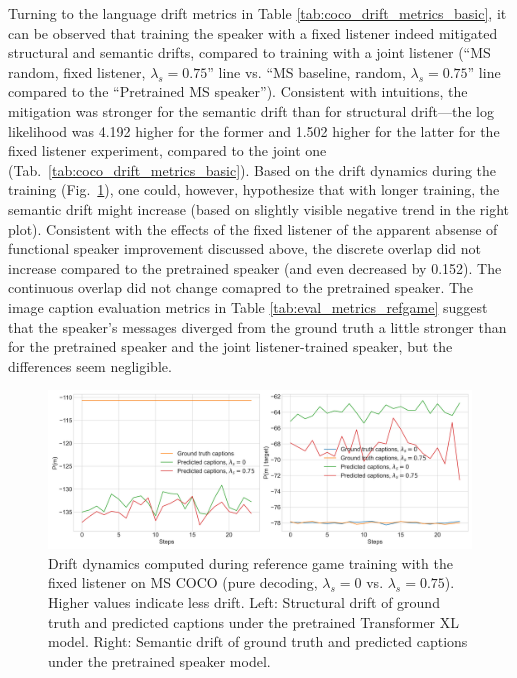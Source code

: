 Turning to the language drift metrics in Table \ref{tab:coco_drift_metrics_basic}, it can be observed that training the speaker with a fixed listener indeed mitigated structural and semantic drifts, compared to training with a joint listener (``MS random, fixed listener, $\lambda_s=0.75$'' line vs. ``MS baseline, random, $\lambda_s=0.75$'' line compared to the ``Pretrained MS speaker''). Consistent with intuitions, the mitigation was stronger for the semantic drift than for structural drift---the log likelihood was 4.192 higher for the former and 1.502 higher for the latter for the fixed listener experiment, compared to the joint one (Tab.~\ref{tab:coco_drift_metrics_basic}). Based on the drift dynamics during the training (Fig.~\ref{fig:coco_fixed_listener_075_str_sem_drift}), one could, however, hypothesize that with longer training, the semantic drift might increase (based on slightly visible negative trend in the right plot). Consistent with the effects of the fixed listener of the apparent absense of functional speaker improvement discussed above, the discrete overlap did not increase compared to the pretrained speaker (and even decreased by 0.152). The continuous overlap did not change comapred to the pretrained speaker. The image caption evaluation metrics in Table \ref{tab:eval_metrics_refgame} suggest that the speaker's messages diverged from the ground truth a little stronger than for the pretrained speaker and the joint listener-trained speaker, but the differences seem negligible. 
\begin{figure}
	\centering
	\includegraphics[width=\linewidth]{images/coco_fixedListener_structural_semantic_drift_4000_pure_0_075_random.png}
	\caption{Drift dynamics computed during reference game training with the fixed listener on MS COCO (pure decoding, $\lambda_s=0$ vs. $\lambda_s=0.75$). Higher values indicate less drift. Left: Structural drift of ground truth and predicted captions under the pretrained Transformer XL model. Right: Semantic drift of ground truth and predicted captions under the pretrained speaker model.}
	\label{fig:coco_fixed_listener_075_str_sem_drift}
\end{figure}

